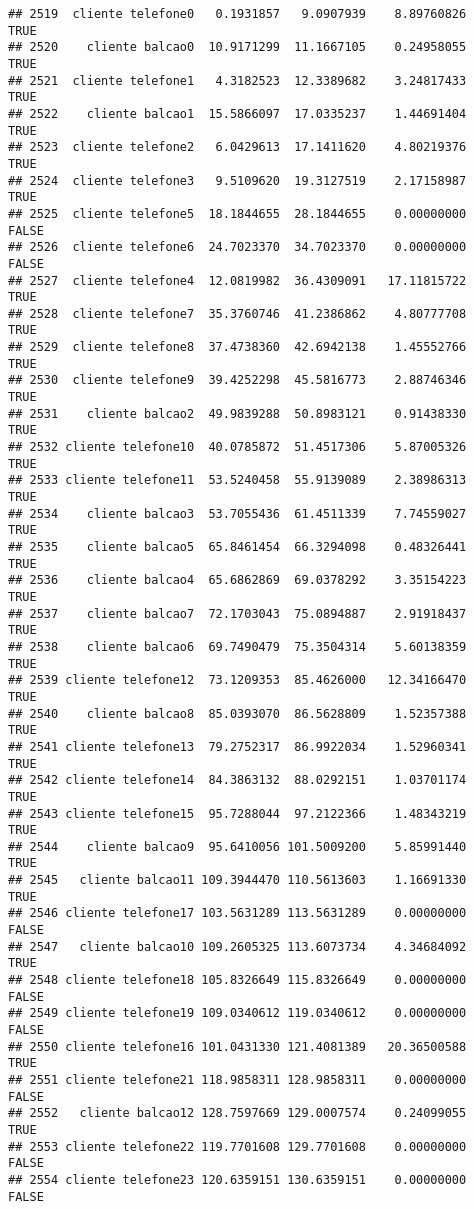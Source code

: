 \documentclass[
]{article}
\begin{document}
\begin{verbatim}
## 2519  cliente telefone0   0.1931857   9.0907939    8.89760826     TRUE
## 2520    cliente balcao0  10.9171299  11.1667105    0.24958055     TRUE
## 2521  cliente telefone1   4.3182523  12.3389682    3.24817433     TRUE
## 2522    cliente balcao1  15.5866097  17.0335237    1.44691404     TRUE
## 2523  cliente telefone2   6.0429613  17.1411620    4.80219376     TRUE
## 2524  cliente telefone3   9.5109620  19.3127519    2.17158987     TRUE
## 2525  cliente telefone5  18.1844655  28.1844655    0.00000000    FALSE
## 2526  cliente telefone6  24.7023370  34.7023370    0.00000000    FALSE
## 2527  cliente telefone4  12.0819982  36.4309091   17.11815722     TRUE
## 2528  cliente telefone7  35.3760746  41.2386862    4.80777708     TRUE
## 2529  cliente telefone8  37.4738360  42.6942138    1.45552766     TRUE
## 2530  cliente telefone9  39.4252298  45.5816773    2.88746346     TRUE
## 2531    cliente balcao2  49.9839288  50.8983121    0.91438330     TRUE
## 2532 cliente telefone10  40.0785872  51.4517306    5.87005326     TRUE
## 2533 cliente telefone11  53.5240458  55.9139089    2.38986313     TRUE
## 2534    cliente balcao3  53.7055436  61.4511339    7.74559027     TRUE
## 2535    cliente balcao5  65.8461454  66.3294098    0.48326441     TRUE
## 2536    cliente balcao4  65.6862869  69.0378292    3.35154223     TRUE
## 2537    cliente balcao7  72.1703043  75.0894887    2.91918437     TRUE
## 2538    cliente balcao6  69.7490479  75.3504314    5.60138359     TRUE
## 2539 cliente telefone12  73.1209353  85.4626000   12.34166470     TRUE
## 2540    cliente balcao8  85.0393070  86.5628809    1.52357388     TRUE
## 2541 cliente telefone13  79.2752317  86.9922034    1.52960341     TRUE
## 2542 cliente telefone14  84.3863132  88.0292151    1.03701174     TRUE
## 2543 cliente telefone15  95.7288044  97.2122366    1.48343219     TRUE
## 2544    cliente balcao9  95.6410056 101.5009200    5.85991440     TRUE
## 2545   cliente balcao11 109.3944470 110.5613603    1.16691330     TRUE
## 2546 cliente telefone17 103.5631289 113.5631289    0.00000000    FALSE
## 2547   cliente balcao10 109.2605325 113.6073734    4.34684092     TRUE
## 2548 cliente telefone18 105.8326649 115.8326649    0.00000000    FALSE
## 2549 cliente telefone19 109.0340612 119.0340612    0.00000000    FALSE
## 2550 cliente telefone16 101.0431330 121.4081389   20.36500588     TRUE
## 2551 cliente telefone21 118.9858311 128.9858311    0.00000000    FALSE
## 2552   cliente balcao12 128.7597669 129.0007574    0.24099055     TRUE
## 2553 cliente telefone22 119.7701608 129.7701608    0.00000000    FALSE
## 2554 cliente telefone23 120.6359151 130.6359151    0.00000000    FALSE

\end{verbatim}
\end{document}
